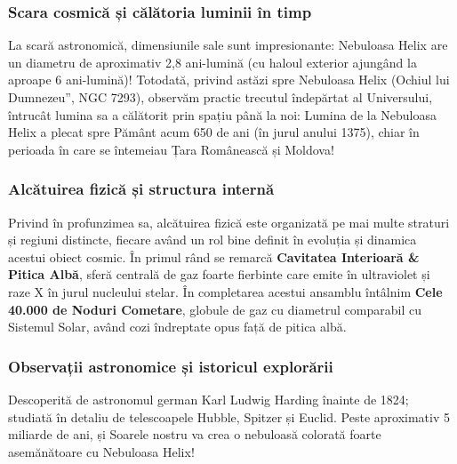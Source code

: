 \subsubsection*{Scara cosmică și călătoria luminii în timp}
La scară astronomică, dimensiunile sale sunt impresionante: Nebuloasa Helix are un diametru de aproximativ 2,8 ani-lumină (cu haloul exterior ajungând la aproape 6 ani-lumină)! Totodată, privind astăzi spre Nebuloasa Helix (\quotedblbase{}Ochiul lui Dumnezeu\textquotedblright{}, NGC 7293), observăm practic trecutul îndepărtat al Universului, întrucât lumina sa a călătorit prin spațiu până la noi: Lumina de la Nebuloasa Helix a plecat spre Pământ acum 650 de ani (în jurul anului 1375), chiar în perioada în care se întemeiau Țara Românească și Moldova!

\subsubsection*{Alcătuirea fizică și structura internă}
Privind în profunzimea sa, alcătuirea fizică este organizată pe mai multe straturi și regiuni distincte, fiecare având un rol bine definit în evoluția și dinamica acestui obiect cosmic. În primul rând se remarcă \textbf{Cavitatea Interioară \& Pitica Albă}, sferă centrală de gaz foarte fierbinte care emite în ultraviolet și raze X în jurul nucleului stelar. În completarea acestui ansamblu întâlnim \textbf{Cele 40.000 de Noduri Cometare}, globule de gaz cu diametrul comparabil cu Sistemul Solar, având cozi îndreptate opus față de pitica albă.

\subsubsection*{Observații astronomice și istoricul explorării}
Descoperită de astronomul german Karl Ludwig Harding înainte de 1824; studiată în detaliu de telescoapele Hubble, Spitzer și Euclid. Peste aproximativ 5 miliarde de ani, și Soarele nostru va crea o nebuloasă colorată foarte asemănătoare cu Nebuloasa Helix!

